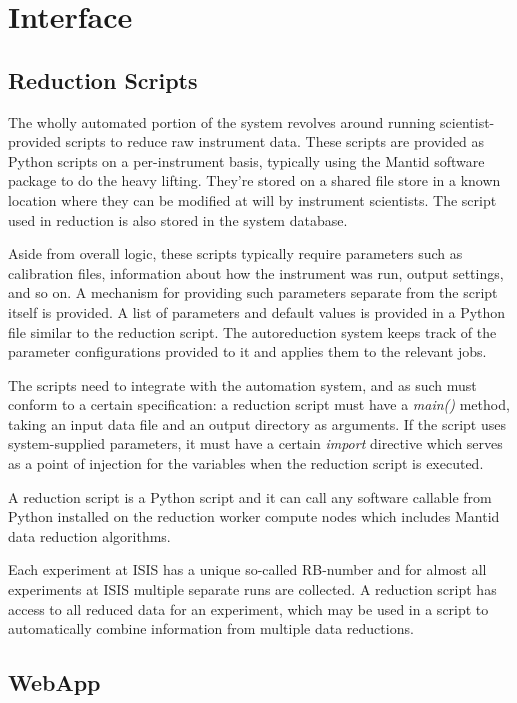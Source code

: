 \documentclass[twocolumn]{article}
\begin{document}
\section{Interface}\label{interface}

\subsection{Reduction Scripts}\label{reduction-scripts}

The wholly automated portion of the system revolves around running
scientist-provided scripts to reduce raw instrument data. These scripts
are provided as Python scripts on a per-instrument basis, typically
using the Mantid software package to do the heavy lifting. They're
stored on a shared file store in a known location where they can be
modified at will by instrument scientists. The script used in
reduction is also stored in the system database.

Aside from overall logic, these scripts typically require parameters
such as calibration files, information about how the instrument was run,
output settings, and so on. A mechanism for providing such parameters 
separate from the script itself is provided. A list of parameters and
default values is provided in a Python file similar to the reduction
script. The autoreduction system keeps track of the parameter
configurations provided to it and applies them to the relevant jobs.

The scripts need to integrate with the automation system, and
as such must conform to a certain specification: a reduction script must have a
\emph{main()} method, taking an input data file and an output directory as
arguments. If the script uses system-supplied parameters, it must have a
certain \emph{import} directive which serves as a point of injection
for the variables when the reduction script is executed.

A reduction script is a Python script and it can call any software 
callable from Python installed on the reduction worker compute nodes which
includes Mantid data reduction algorithms.

Each experiment at ISIS has a unique so-called RB-number
and for almost all experiments at ISIS multiple separate runs are collected.
A reduction script has access to all reduced data for an experiment, which 
may be used in a script to automatically combine information from multiple 
data reductions.

\subsection{WebApp}\label{web-app}
\end{document}

